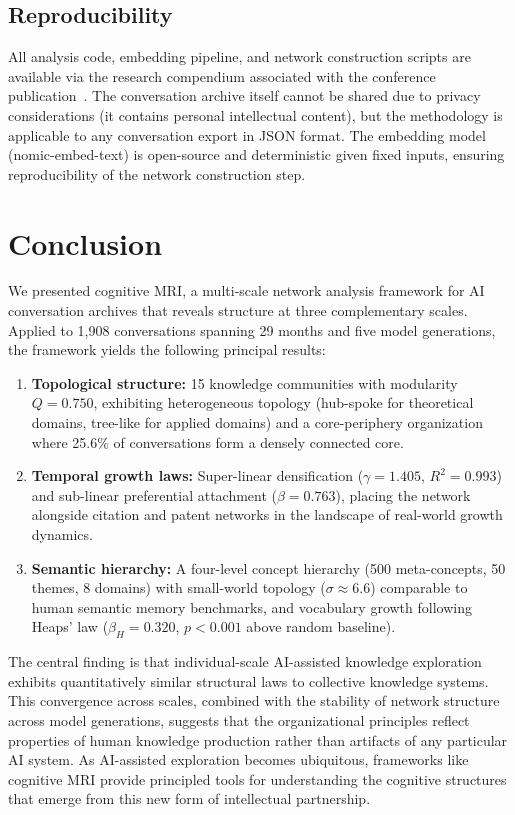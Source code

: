 \documentclass[journal]{IEEEtran}
\begin{document}
\subsection{Reproducibility}

All analysis code, embedding pipeline, and network construction scripts
are available via the research compendium associated with the conference
publication~\cite{towell2025cognitive}.  The conversation archive itself
cannot be shared due to privacy considerations (it contains personal
intellectual content), but the methodology is applicable to any
conversation export in JSON format.  The embedding model
(nomic-embed-text) is open-source and deterministic given fixed inputs,
ensuring reproducibility of the network construction step.

\section{Conclusion}
\label{sec:conclusion}

We presented cognitive MRI, a multi-scale network analysis framework for
AI conversation archives that reveals structure at three complementary
scales.  Applied to 1,908 conversations spanning 29 months and five
model generations, the framework yields the following principal results:

\begin{enumerate}
\item \textbf{Topological structure:} 15 knowledge communities with
  modularity $Q = 0.750$, exhibiting heterogeneous topology (hub-spoke
  for theoretical domains, tree-like for applied domains) and a
  core-periphery organization where 25.6\% of conversations form
  a densely connected core.
\item \textbf{Temporal growth laws:} Super-linear densification
  ($\gamma = 1.405$, $R^2 = 0.993$) and sub-linear preferential
  attachment ($\beta = 0.763$), placing the network alongside citation
  and patent networks in the landscape of real-world growth dynamics.
\item \textbf{Semantic hierarchy:} A four-level concept hierarchy
  (500 meta-concepts, 50 themes, 8 domains) with small-world topology
  ($\sigma \approx 6.6$) comparable to human semantic memory benchmarks,
  and vocabulary growth following Heaps' law ($\beta_H = 0.320$,
  $p < 0.001$ above random baseline).
\end{enumerate}

The central finding is that individual-scale AI-assisted knowledge
exploration exhibits quantitatively similar structural laws to
collective knowledge systems.  This convergence across scales, combined
with the stability of network structure across model generations,
suggests that the organizational principles reflect properties of human
knowledge production rather than artifacts of any particular AI system.
As AI-assisted exploration becomes ubiquitous, frameworks like cognitive
MRI provide principled tools for understanding the cognitive structures
that emerge from this new form of intellectual partnership.
\end{document}
